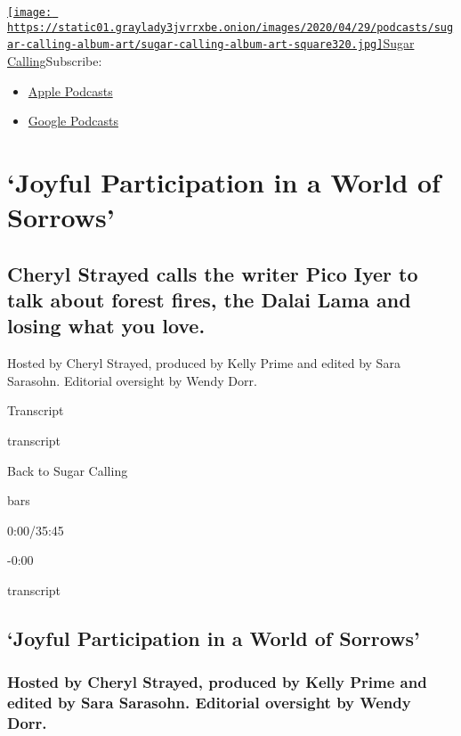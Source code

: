 \href{https://www.nytimes3xbfgragh.onion/column/sugar-calling}{\texttt{[image: https://static01.graylady3jvrrxbe.onion/images/2020/04/29/podcasts/sugar-calling-album-art/sugar-calling-album-art-square320.jpg]}Sugar
Calling}Subscribe:

\begin{itemize}
\tightlist
\item
  \href{https://itunes.apple.com/us/podcast/id1505881384}{Apple
  Podcasts}
\item
  \href{https://podcasts.google.com/?feed=aHR0cHM6Ly9yc3MuYXJ0MTkuY29tL3N1Z2FyLWNhbGxpbmc\&ved=0CAUQrrcFahcKEwjA8Kyn09voAhUAAAAAHQAAAAAQBQ}{Google
  Podcasts}
\end{itemize}

\hypertarget{joyful-participation-in-a-world-of-sorrows-1}{%
\section{`Joyful Participation in a World of
Sorrows'}\label{joyful-participation-in-a-world-of-sorrows-1}}

\hypertarget{cheryl-strayed-calls-the-writer-pico-iyer-to-talk-about-forest-fires-the-dalai-lama-and-losing-what-you-love-1}{%
\subsection{Cheryl Strayed calls the writer Pico Iyer to talk about
forest fires, the Dalai Lama and losing what you
love.}\label{cheryl-strayed-calls-the-writer-pico-iyer-to-talk-about-forest-fires-the-dalai-lama-and-losing-what-you-love-1}}

Hosted by Cheryl Strayed, produced by Kelly Prime and edited by Sara
Sarasohn. Editorial oversight by Wendy Dorr.

Transcript

transcript

Back to Sugar Calling

bars

0:00/35:45

-0:00

transcript

\hypertarget{joyful-participation-in-a-world-of-sorrows-2}{%
\subsection{`Joyful Participation in a World of
Sorrows'}\label{joyful-participation-in-a-world-of-sorrows-2}}

\hypertarget{hosted-by-cheryl-strayed-produced-by-kelly-prime-and-edited-by-sara-sarasohn-editorial-oversight-by-wendy-dorr-1}{%
\subsubsection{Hosted by Cheryl Strayed, produced by Kelly Prime and
edited by Sara Sarasohn. Editorial oversight by Wendy
Dorr.}\label{hosted-by-cheryl-strayed-produced-by-kelly-prime-and-edited-by-sara-sarasohn-editorial-oversight-by-wendy-dorr-1}}


